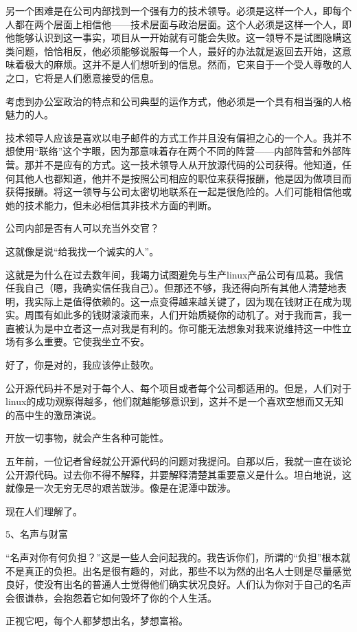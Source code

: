 另一个困难是在公司内部找到一个强有力的技术领导。必须是这样一个人，即每个人都在两个层面上相信他——技术层面与政治层面。这个人必须是这样一个人，即他能够认识到这一事实，项目从一开始就有可能会失败。这一领导不是试图隐瞒这类问题，恰恰相反，他必须能够说服每一个人，最好的办法就是返回去开始，这意味着极大的麻烦。这并不是人们想听到的信息。然而，它来自于一个受人尊敬的人之口，它将是人们愿意接受的信息。

考虑到办公室政治的特点和公司典型的运作方式，他必须是一个具有相当强的人格魅力的人。

技术领导人应该是喜欢以电子邮件的方式工作并且没有偏袒之心的一个人。我并不想使用“联络”这个字眼，因为那意味着存在两个不同的阵营——内部阵营和外部阵营。那并不是应有的方式。这一技术领导人从开放源代码的公司获得。他知道，任何其他人也都知道，他并不是按照公司相应的职位来获得报酬，他是因为做项目而获得报酬。将这一领导与公司太密切地联系在一起是很危险的。人们可能相信他或她的技术能力，但未必相信其非技术方面的判断。

公司内部是否有人可以充当外交官？

这就像是说“给我找一个诚实的人”。

这就是为什么在过去数年间，我竭力试图避免与生产linux产品公司有瓜葛。我信任我自己（嗯，我确实信任我自己）。但那还不够，我还得向所有其他人清楚地表明，我实际上是值得依赖的。这一点变得越来越关键了，因为现在钱财正在成为现实。周围有如此多的钱财滚滚而来，人们开始质疑你的动机了。对于我而言，我一直被认为是中立者这一点对我是有利的。你可能无法想象对我来说维持这一中性立场有多么重要。它使我坐立不安。

好了，你是对的，我应该停止鼓吹。

公开源代码并不是对于每个人、每个项目或者每个公司都适用的。但是，人们对于linux的成功观察得越多，他们就越能够意识到，这并不是一个喜欢空想而又无知的高中生的激昂演说。

开放一切事物，就会产生各种可能性。

五年前，一位记者曾经就公开源代码的问题对我提问。自那以后，我就一直在谈论公开源代码。过去你不得不解释，并要解释清楚其重要意义是什么。坦白地说，这就像是一次无穷无尽的艰苦跋涉。像是在泥潭中跋涉。

现在人们理解了。

 
5、名声与财富

“名声对你有何负担？”这是一些人会问起我的。我告诉你们，所谓的“负担”根本就不是真正的负担。出名是很有趣的，对此，那些不以为然的出名人士则是尽量感觉良好，使没有出名的普通人士觉得他们确实状况良好。人们认为你对于自己的名声会很谦恭，会抱怨着它如何毁坏了你的个人生活。

正视它吧，每个人都梦想出名，梦想富裕。

